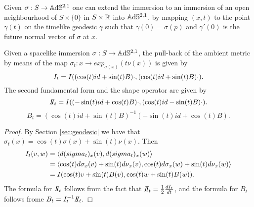 Given $\sigma:S \to \mathbb{A}\mathrm{d}\mathbb{S}^{2,1}$ one can extend the immersion to an immersion of an open neighbourhood of $S \times\{0\}$ in $S\times\mathbb{R}$ into $\mathbb{A}\mathrm{d}\mathbb{S}^{2,1}$, by mapping $(x,t)$ to the point $\gamma(t)$ on the timelike geodesic $\gamma$ such that $\gamma(0)=\sigma(p)$ and $\gamma'(0)$ is the future normal vector of $\sigma$ at $x$.

\begin{lemma}
    Given a spacelike immersion $\sigma:S\to \mathbb{A}\mathrm{d}\mathbb{S}^{2,1}$, the pull-back of the ambient metric by means of the map $\sigma_t : x \to exp_{\sigma(x)}(t\nu(x))$ is given by 
    \[
        I_t = I((\cos(t) id + \sin(t) B)\cdot, (\cos(t) id + \sin(t) B)\cdot).
    \]
    The second fundamental form and the shape operator are given by
    \[
        \II_t = \I((-\sin(t) id + \cos(t) B)\cdot, (\cos(t) id - \sin(t) B)\cdot).
    \]
    \[
        B_t = (\cos(t) id + \sin(t) B)^{-1}(-\sin(t) id + \cos(t) B).
    \]
\end{lemma}

\begin{proof}
    By Section \ref{sec:geodesic} we have that $\sigma_t(x) = \cos(t)\sigma(x) + \sin(t) \nu(x)$.
    Then
    \[
    \begin{split}
        I_t (v,w)& = \langle d(sigma_t)_x (v), d(sigma_t)_x (w) \rangle \\
        & = \langle \cos(t)d\sigma_x (v) + \sin(t)d\nu_x (v), \cos(t)d\sigma_x (w) + \sin(t)d\nu_x (w) \rangle \\
        & = I(\cos(t) v + \sin(t) B(v), \cos(t) w + \sin(t) B(w) ).
    \end{split}
    \]
    The formula for $\II_t$ follows from the fact that $\II_t = \frac{1}{2} \frac{d \I_t}{d t}$, and the formula for $B_t$ follows frome $B_t = I_t^{-1} \II_t$. 
\end{proof}


